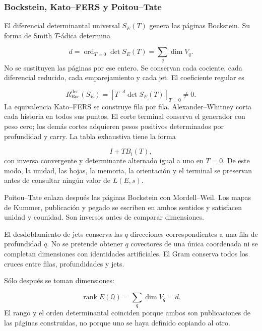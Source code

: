 \subsubsection{Bockstein, Kato–FERS y Poitou–Tate}
El diferencial determinantal universal \(S_E(T)\) genera las páginas Bockstein. Su forma de Smith \(T\)-ádica determina\par
\[
d
=
\operatorname{ord}_{T=0}
\det S_E(T)
=
\sum_q \dim V_q.
\]
No se sustituyen las páginas por ese entero. Se conservan cada cociente, cada diferencial reducido, cada emparejamiento y cada jet. El coeficiente regular es\par
\[
R_{\mathrm{Boc}}^{\mathrm{der}}(S_E)
=
\left[
T^{-d}\det S_E(T)
\right]_{T=0}
\neq0.
\]
La equivalencia Kato–FERS se construye fila por fila. Alexander–Whitney corta cada historia en todos sus puntos. El corte terminal conserva el generador con peso cero; los demás cortes adquieren pesos positivos determinados por profundidad y carry. La tabla exhaustiva tiene la forma\par
\[
I+TB_i(T),
\]
con inversa convergente y determinante alternado igual a uno en \(T=0\). De este modo, la unidad, las hojas, la memoria, la orientación y el terminal se preservan antes de consultar ningún valor de \(L(E,s)\).\par
Poitou–Tate enlaza después las páginas Bockstein con Mordell–Weil. Los mapas de Kummer, publicación y pegado se escriben en ambos sentidos y satisfacen unidad y counidad. Son inversos antes de comparar dimensiones.\par
El desdoblamiento de jets conserva las \(q\) direcciones correspondientes a una fila de profundidad \(q\). No se pretende obtener \(q\) covectores de una única coordenada ni se completan dimensiones con identidades artificiales. El Gram conserva todos los cruces entre filas, profundidades y jets.\par
Sólo después se toman dimensiones:\par
\[
\operatorname{rank}E(\mathbb Q)
=
\sum_q\dim V_q
=
d.
\]
El rango y el orden determinantal coinciden porque ambos son publicaciones de las páginas construidas, no porque uno se haya definido copiando al otro.\par
{}
